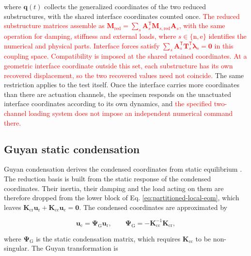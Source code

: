 \documentclass[a4paper,fleqn,review,12pt]{cas-sc}
\numberwithin{equation}{section}
\newcommand{\rev}[1]{\textcolor{red}{#1}}
\begin{document}
\noindent where \(\bm{q}(t)\) collects the generalized coordinates of the two reduced substructures, with the shared interface coordinates counted once. \rev{The reduced substructure matrices assemble as \(\mathbf M_{\mathrm{red}}=\sum_s\mathbf A_s^{\mathsf T}\mathbf M_{s,\mathrm{red}}\mathbf A_s\), with the same operation for damping, stiffness and external loads, where \(s\in\{\mathrm n,\mathrm e\}\) identifies the numerical and physical parts. Interface forces satisfy \(\sum_s\mathbf A_s^{\mathsf T}\mathbf T_s^{\mathsf T}\bm\lambda_s=\bm0\) in this coupling space. Compatibility is imposed at the shared retained coordinates. At a geometric interface coordinate outside this set, each substructure has its own recovered displacement, so the two recovered values need not coincide.} The same restriction applies to the test itself. Once the interface carries more coordinates than there are actuation channels, the specimen responds on the unactuated interface coordinates according to its own dynamics, and \rev{the specified two-channel loading system does not impose an independent numerical command there.}

\subsection{Guyan static condensation} \label{sec21}

Guyan condensation derives the condensed coordinates from static equilibrium \cite{Guyan1965}. The reduction basis is built from the static response of the condensed coordinates. Their inertia, their damping and the load acting on them are therefore dropped from the lower block of Eq. \eqref{eq:partitioned-local-eom}, which leaves \(\mathbf{K}_{\mathrm{cr}}\bm{u}_{\mathrm{r}}+\mathbf{K}_{\mathrm{cc}}\bm{u}_{\mathrm{c}}=\bm{0}\). The condensed coordinates are approximated by

\vspace{-3.5em}
\begin{equation}
	\bm{u}_{\mathrm{c}}=\bm{\Psi}_{\mathrm{G}}\bm{u}_{\mathrm{r}},
	\qquad
	\bm{\Psi}_{\mathrm{G}}=-\mathbf{K}_{\mathrm{cc}}^{-1}\mathbf{K}_{\mathrm{cr}},
	\label{eq:guyan-coordinate-relation}
\end{equation}
\vspace{-3.5em}

\noindent where \(\bm{\Psi}_{\mathrm{G}}\) is the static condensation matrix, which requires \(\mathbf{K}_{\mathrm{cc}}\) to be non-singular.
The Guyan transformation is
\end{document}
